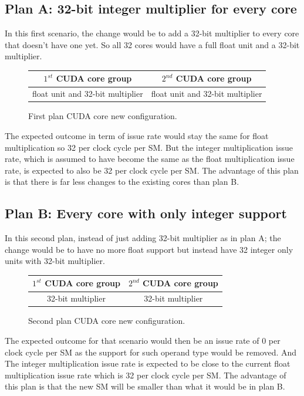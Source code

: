 \documentclass{report}
\begin{document}
   \subsection{Plan A: 32-bit integer multiplier for every core}
    In this first scenario, the change would be to add a 32-bit multiplier to every core that doesn't have one yet. So all 32 cores would have a full float unit and a 32-bit multiplier.
    \begin{figure}[H]
      \centering
       \begin{tabular}{ | c | c | }
    	    \hline
    	    $1^{st}$ CUDA core group & $2^{nd}$ CUDA core group \\ \hline
    	   float unit and 32-bit multiplier & float unit and 32-bit multiplier \\ \hline
  	\end{tabular}
  	\captionsetup{justification=centering}
  	\caption{First plan CUDA core new configuration.}
  	\label{fig:planA_cores}
   \end{figure}
    The expected outcome in term of issue rate would stay the same for float multiplication so 32 per clock cycle per SM. But the integer multiplication issue rate, which is assumed to have become the same as the float multiplication issue rate, is expected to also be 32 per clock cycle per SM.
    The advantage of this plan is that there is far less changes to the existing cores than plan B.
   \subsection{Plan B: Every core with only integer support}
   In this second plan, instead of just adding 32-bit multiplier as in plan A; the change would be to have no more float support but instead have 32 integer only units with 32-bit multiplier.
   \begin{figure}[H]
      \centering
       \begin{tabular}{ | c | c | }
    	    \hline
    	    $1^{st}$ CUDA core group & $2^{nd}$ CUDA core group \\ \hline
    	   32-bit multiplier & 32-bit multiplier \\ \hline
  	\end{tabular}
  	\captionsetup{justification=centering}
  	\caption{Second plan CUDA core new configuration.}
  	\label{fig:planB_cores}
   \end{figure}
   The expected outcome for that scenario would then be an issue rate of 0 per clock cycle per SM as the support for such operand type would be removed.
   And The integer multiplication issue rate is expected to be close to the current float multiplication issue rate which is 32 per clock cycle per SM.
   The advantage of this plan is that the new SM will be smaller than what it would be in plan B. 
\end{document}
